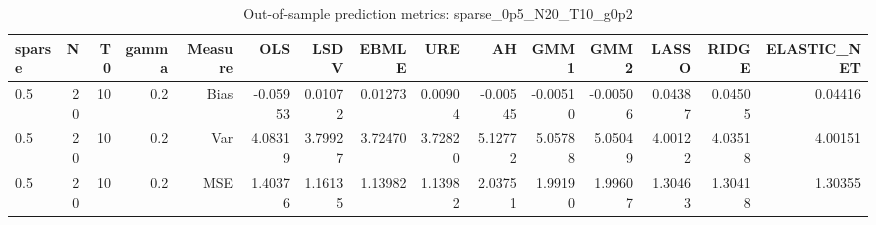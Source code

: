 \begin{table}[!htbp]\centering
\caption{Out-of-sample prediction metrics: sparse_0p5_N20_T10_g0p2}
\label{tab:table3_sparse_0p5_N20_T10_g0p2}
\begin{tabular}{lrrrrrrrrrrrrrr}
\hline
sparse & N & T0 & gamma & Measure & OLS & LSDV & EBMLE & URE & AH & GMM1 & GMM2 & LASSO & RIDGE & ELASTIC_NET \\
\hline
0.5 & 20 & 10 & 0.2 & Bias & -0.05953 & 0.01072 & 0.01273 & 0.00904 & -0.00545 & -0.00510 & -0.00506 & 0.04387 & 0.04505 & 0.04416 \\
0.5 & 20 & 10 & 0.2 & Var & 4.08319 & 3.79927 & 3.72470 & 3.72820 & 5.12772 & 5.05788 & 5.05049 & 4.00122 & 4.03518 & 4.00151 \\
0.5 & 20 & 10 & 0.2 & MSE & 1.40376 & 1.16135 & 1.13982 & 1.13982 & 2.03751 & 1.99190 & 1.99607 & 1.30463 & 1.30418 & 1.30355 \\
\hline
\end{tabular}
\end{table}

